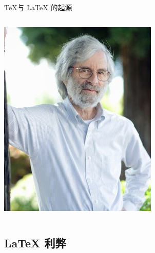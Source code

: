 \begin{frame}[fragile]{\TeX 与 \LaTeX{} 的起源}
\begin{columns}[T]
    \hspace{-10mm} \includegraphics[width=\textwidth]{images/Lamport.jpg}

  \end{columns}
\end{frame}

\subsection{\LaTeX{} 利弊}


